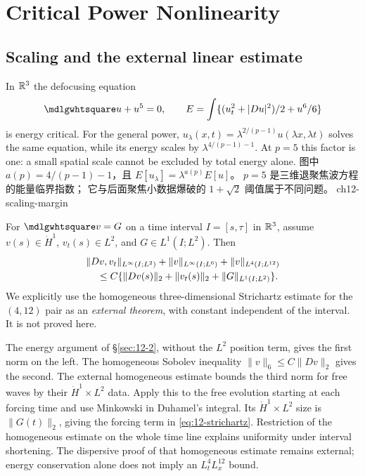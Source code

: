 \section{Critical Power Nonlinearity}
\label{sec:12-4}
\subsection{Scaling and the external linear estimate}
In $\mathbb{R}^3$ the defocusing equation
\begin{equation}\label{eq:12-quintic}
 \PDEWave u+u^5=0,\qquad
 E=\int\{(u_t^2+|Du|^2)/2+u^6/6\}
\end{equation}
is energy critical. For the general power,
$u_\lambda(x,t)=\lambda^{2/(p-1)}u(\lambda x,\lambda t)$ solves
the same equation, while its energy scales by
$\lambda^{4/(p-1)-1}$. At $p=5$ this factor is one: a small spatial
scale cannot be excluded by total energy alone.
{图中 $a(p)=4/(p-1)-1$，且 $E[u_\lambda]=\lambda^{a(p)}E[u]$。
$p=5$ 是三维退聚焦波方程的能量临界指数；
它与后面聚焦小数据爆破的 $1+\sqrt2$ 阈值属于不同问题。}
{ch12-scaling-margin}

\begin{theorem}
For $\PDEWave v=G$ on a time interval $I=[s,\tau]$ in $\mathbb{R}^3$,
assume $v(s)\in\dot H^1$, $v_t(s)\in L^2$, and
$G\in L^1(I;L^2)$. Then
\begin{equation}\label{eq:12-strichartz}
 \begin{split}
 &\|Dv,v_t\|_{L^\infty(I;L^2)}+\|v\|_{L^\infty(I;L^6)}
       +\|v\|_{L^4(I;L^{12})}\\
 &\hspace{4mm}\le C\{\|Dv(s)\|_2+\|v_t(s)\|_2
                               +\|G\|_{L^1(I;L^2)}\}.
 \end{split}
\end{equation}
We explicitly use the homogeneous three-dimensional Strichartz
estimate for the $(4,12)$ pair as an \emph{external theorem}, with
constant independent of the interval. It is not proved here.
\end{theorem}
\begin{expandedproof}
The energy argument of \S\ref{sec:12-2}, without the $L^2$ position
term, gives the first norm on the left. The homogeneous Sobolev
inequality $\|v\|_6\le C\|Dv\|_2$ gives the second. The external
homogeneous estimate bounds the third norm for free waves by their
$\dot H^1\times L^2$ data. Apply this to the free evolution starting
at each forcing time and use Minkowski in Duhamel's integral. Its
$\dot H^1\times L^2$ size is $\|G(t)\|_2$, giving the forcing term
in \eqref{eq:12-strichartz}. Restriction of the homogeneous estimate
on the whole time line explains uniformity under interval shortening.
The dispersive proof of that homogeneous estimate remains external;
energy conservation alone does not imply an $L^4_tL^{12}_x$ bound.
\end{expandedproof}

